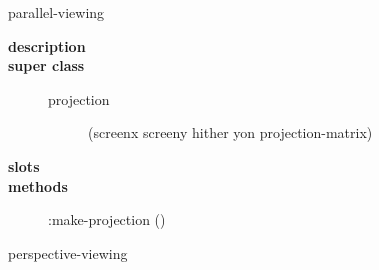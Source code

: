 \vfill
\pagebreak
{\jLarge parallel-viewing}
\\ [0.5cm]

\begin{description}

\item[{\jlarge \bf description}]\hspace{1cm}

\item[{\jlarge \bf super class}]\hspace{1cm}
\begin{description}
\item[projection] (screenx screeny hither yon projection-matrix)
\end{description}

\item[{\jlarge \bf slots}]\hspace{1cm}

\item[{\jlarge \bf methods}]\hspace{1cm}
\begin{description}
\item[:make-projection ()]\hspace{1cm} 
\end{description}
\end{description}
\vspace{2.0cm}
{\jLarge perspective-viewing}
\\ [0.5cm]

